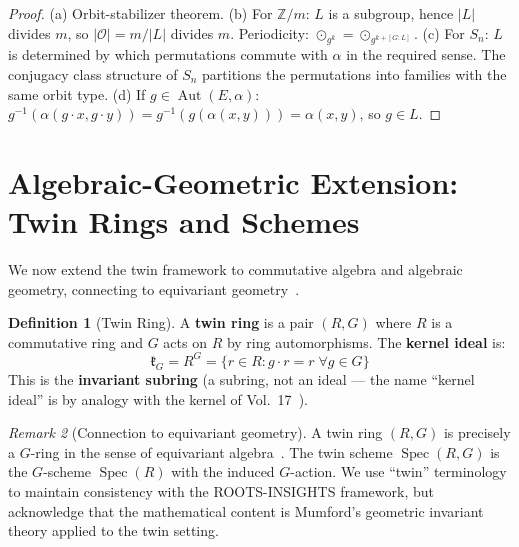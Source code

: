 \documentclass[11pt,twocolumn]{article}
\theoremstyle{plain}\newtheorem{theorem}{Theorem}\newtheorem{proposition}[theorem]{Proposition}\newtheorem{corollary}[theorem]{Corollary}\newtheorem{lemma}[theorem]{Lemma}
\theoremstyle{definition}\newtheorem{definition}[theorem]{Definition}\newtheorem{example}[theorem]{Example}
\theoremstyle{remark}\newtheorem{remark}[theorem]{Remark}
\newcommand{\Aut}{\operatorname{Aut}}
\newcommand{\Spec}{\operatorname{Spec}}
\begin{document}
\begin{proof}
(a) Orbit-stabilizer theorem.
(b) For $\mathbb{Z}/m$: $L$ is a subgroup, hence $|L|$ divides $m$, so $|\mathcal{O}| = m/|L|$ divides $m$. Periodicity: $\odot_{g^{k}} = \odot_{g^{k + [G:L]}}$.
(c) For $S_n$: $L$ is determined by which permutations commute with $\alpha$ in the required sense. The conjugacy class structure of $S_n$ partitions the permutations into families with the same orbit type.
(d) If $g \in \Aut(E, \alpha)$: $g^{-1}(\alpha(g \cdot x, g \cdot y)) = g^{-1}(g(\alpha(x,y))) = \alpha(x,y)$, so $g \in L$.
\end{proof}


\section{Algebraic-Geometric Extension: Twin Rings and Schemes}
\label{sec:ag}

We now extend the twin framework to commutative algebra and algebraic geometry, connecting to equivariant geometry~\cite{mumford1965,thomason1987}.

\begin{definition}[Twin Ring]\label{def:twin-ring}
A \textbf{twin ring} is a pair $(R, G)$ where $R$ is a commutative ring and $G$ acts on $R$ by ring automorphisms. The \textbf{kernel ideal} is:
\begin{equation}
\mathfrak{k}_G = R^G = \{r \in R : g \cdot r = r \;\forall g \in G\}
\end{equation}
This is the \textbf{invariant subring} (a subring, not an ideal --- the name ``kernel ideal'' is by analogy with the kernel of Vol.~17~\cite{nembe2026vol17}).
\end{definition}

\begin{remark}[Connection to equivariant geometry]
A twin ring $(R, G)$ is precisely a $G$-ring in the sense of equivariant algebra~\cite{mumford1965}. The twin scheme $\Spec(R, G)$ is the $G$-scheme $\Spec(R)$ with the induced $G$-action. We use ``twin'' terminology to maintain consistency with the ROOTS-INSIGHTS framework, but acknowledge that the mathematical content is Mumford's geometric invariant theory applied to the twin setting.
\end{remark}
\end{document}
